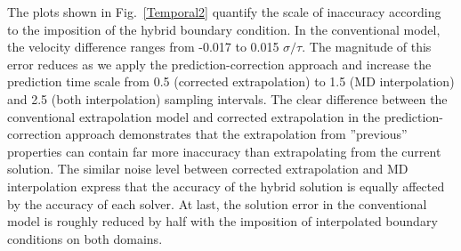 \documentclass[preprint,12pt]{elsarticle}
\begin{document}
The plots shown in Fig.~\ref{Temporal2} quantify the scale of inaccuracy according to the imposition of the hybrid boundary condition. In the conventional model, the velocity difference ranges from -0.017 to 0.015 $\sigma/\tau$. The magnitude of this error reduces as we apply the prediction-correction approach and increase the prediction time scale from 0.5 (corrected extrapolation) to 1.5 (MD interpolation) and 2.5 (both interpolation) sampling intervals. The clear difference between the conventional extrapolation model and corrected extrapolation in the prediction-correction approach demonstrates that the extrapolation from ''previous'' properties can contain far more inaccuracy than extrapolating from the current solution. The similar noise level between corrected extrapolation and MD interpolation express that the accuracy of the hybrid solution is equally affected by the accuracy of each solver. At last, the solution error in the conventional model is roughly reduced by half with the imposition of interpolated boundary conditions on both domains. 
\end{document}
